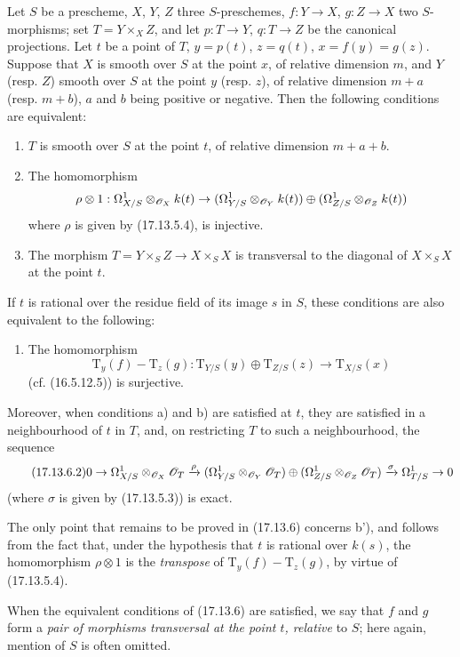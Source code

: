 \begin{corollary}[17.13.6]\label{IV.17.13.6}
Let $S$ be a prescheme, $X$, $Y$, $Z$ three $S$-preschemes, $f:Y\to X$, $g:Z\to X$ two $S$-morphisms; set $T=Y\times_XZ$, and let $p:T\to Y$, $q:T\to Z$ be the canonical projections. Let $t$ be a point of $T$, $y=p(t)$, $z=q(t)$, $x=f(y)=g(z)$. Suppose that $X$ is smooth over $S$ at the point $x$, of relative dimension $m$, and $Y$ (resp. $Z$) smooth over $S$ at the point $y$ (resp. $z$), of relative dimension $m+a$ (resp. $m+b$), $a$ and $b$ being positive or negative. Then the following conditions are equivalent:
\begin{enumerate}
  \item[a)] $T$ is smooth over $S$ at the point $t$, of relative dimension $m+a+b$.
  \item[b)] The homomorphism
  \[
  \rho\otimes1:\Omega^1_{X/S}\otimes_{\mathscr{O}_X}k(t)\to
  (\Omega^1_{Y/S}\otimes_{\mathscr{O}_Y}k(t))\oplus
  (\Omega^1_{Z/S}\otimes_{\mathscr{O}_Z}k(t))
  \]
  where $\rho$ is given by (17.13.5.4), is injective.
  \item[c)] The morphism $T=Y\times_SZ\to X\times_SX$ is transversal to the diagonal of $X\times_SX$ at the point $t$.
\end{enumerate}
If $t$ is rational over the residue field of its image $s$ in $S$, these conditions are also equivalent to the following:
\begin{enumerate}
  \item[b')] The homomorphism
  \[
  \label{IV.17.13.6.1}
  \tag{17.13.6.1}
  \mathrm{T}_y(f)-\mathrm{T}_z(g):\mathrm{T}_{Y/S}(y)\oplus\mathrm{T}_{Z/S}(z)\to\mathrm{T}_{X/S}(x)
  \]
  (cf. (16.5.12.5)) is surjective.
\end{enumerate}
Moreover, when conditions a) and b) are satisfied at $t$, they are satisfied in a neighbourhood of $t$ in $T$, and, on restricting $T$ to such a neighbourhood, the sequence
\[
\label{IV.17.13.6.2}
\tag{17.13.6.2}
0\to\Omega^1_{X/S}\otimes_{\mathscr{O}_X}\mathscr{O}_T\xrightarrow{\rho}
(\Omega^1_{Y/S}\otimes_{\mathscr{O}_Y}\mathscr{O}_T)\oplus
(\Omega^1_{Z/S}\otimes_{\mathscr{O}_Z}\mathscr{O}_T)
\xrightarrow{\sigma}\Omega^1_{T/S}\to0
\]
(where $\sigma$ is given by (17.13.5.3)) is exact.

The only point that remains to be proved in (17.13.6) concerns b'), and follows from the fact that, under the hypothesis that $t$ is rational over $k(s)$, the homomorphism $\rho\otimes1$ is the \emph{transpose} of $\mathrm{T}_y(f)-\mathrm{T}_z(g)$, by virtue of (17.13.5.4).

When the equivalent conditions of (17.13.6) are satisfied, we say that $f$ and $g$ form a \emph{pair of morphisms transversal at the point $t$, relative} to $S$; here again, mention of $S$ is often omitted.
\end{corollary}

